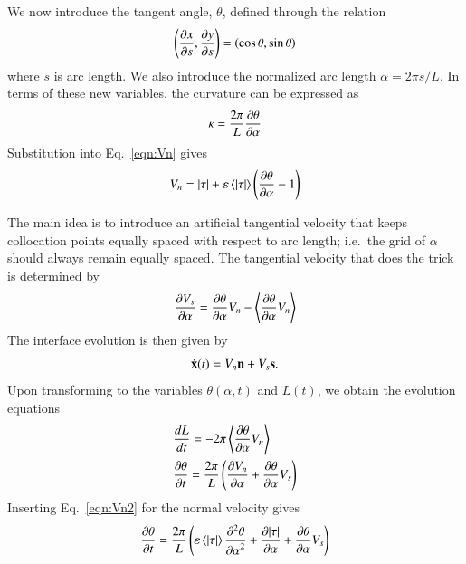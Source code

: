 \documentclass[preprint, 10pt]{elsarticle}
\begin{document}
We now introduce the tangent angle, $\theta$, defined through the relation
\begin{equation}
\left( \frac{\partial x}{\partial s}, \frac{\partial y}{\partial s} \right) = \left(\cos \theta, \sin \theta \right)
\end{equation}
where $s$ is arc length. We also introduce the normalized arc length $\alpha = 2 \pi s / L$. In terms of these new variables, the curvature can be expressed as
\begin{equation}
\kappa = \frac{2 \pi}{L} \frac{\partial \theta}{\partial \alpha}
\end{equation}
Substitution into Eq.~\eqref{eqn:Vn} gives
\begin{equation}
\label{eqn:Vn2}
V_n = \lvert \tau \rvert +  \varepsilon \left< \lvert \tau \rvert \right>   \left(\frac{\partial \theta}{\partial \alpha} - 1 \right)
\end{equation}

The main idea is to introduce an artificial tangential velocity that keeps collocation points equally spaced with respect to arc length; i.e.~the grid of $\alpha$ should always remain equally spaced. The tangential velocity that does the trick is determined by \cite{hou-low-she1994}
\begin{equation}
\frac{\partial V_s}{\partial \alpha} = \frac{\partial \theta}{\partial \alpha} V_n - \left< \frac{\partial \theta}{\partial \alpha} V_n \right>
\end{equation}
The interface evolution is then given by
\begin{equation}
\dot{{\mathbf{x}}}(t) = V_n {\mathbf{n}} + V_s {\mathbf{s}}.
\end{equation}
Upon transforming to the variables $\theta(\alpha,t)$ and $L(t)$, we obtain the evolution equations
\begin{align}
\label{eqn:Levo0}
& \frac{d L}{d t} = - 2 \pi \left< \frac{\partial \theta}{\partial \alpha} V_n \right> \\
\label{eqn:thetaevo0}
& \frac{\partial \theta}{\partial t} = \frac{2 \pi}{L} \left( \frac{\partial V_n}{\partial \alpha} + \frac{\partial \theta}{\partial \alpha} V_s \right)
\end{align}
Inserting Eq.~\eqref{eqn:Vn2} for the normal velocity gives
\begin{equation}
\frac{\partial \theta}{\partial t} = \frac{2\pi}{L} \left(
\varepsilon \left< \lvert \tau \rvert \right> \frac{\partial^2 \theta}{{\partial \alpha}^2} + \frac{\partial \lvert \tau \rvert}{\partial \alpha} + \frac{\partial \theta}{\partial \alpha} V_s \right)
\end{equation}
\end{document}
